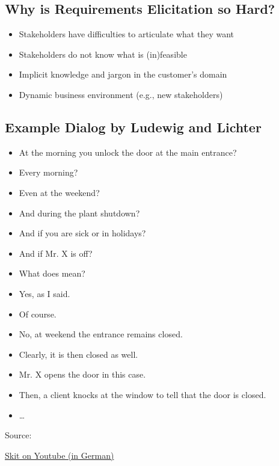 \subsection{Why is Requirements Elicitation so Hard?}
\begin{frame}{\insertsubsection}
	\begin{fancycolumns}[animation=none,widths={66}]
		\begin{example}{}
			\begin{itemize}
				\item Stakeholders have difficulties to articulate what they want
				\item Stakeholders do not know what is (in)feasible
				\item Implicit knowledge and jargon in the customer's domain
				\item Dynamic business environment (e.g., new stakeholders)
			\end{itemize}
		\end{example}
	\end{fancycolumns}
\end{frame}

\subsection{Example Dialog by Ludewig and Lichter}
\begin{frame}{\insertsubsection}
	\begin{fancycolumns}[animation=none]
		\begin{itemize}
			\item At the morning you unlock the door at the main entrance?
			\item Every morning?
			\item Even at the weekend?
			\item And during the plant shutdown?
			\item And if you are sick or in holidays?
			\item And if Mr. X is off?
			\item What does  mean?
		\end{itemize}
		\nextcolumn\vspace{5mm}
		\begin{itemize}
			\item Yes, as I said.
			\item Of course.
			\item No, at weekend the entrance remains closed.
			\item Clearly, it is then closed as well.
			\item Mr. X opens the door in this case.
			\item Then, a client knocks at the window to tell that the door is closed.
			\item \ldots
		\end{itemize}
	\end{fancycolumns}
	\vspace{5mm}
	
	Source: \ludewiglichter
	
	\href{https://youtu.be/NEUNEmJQGMw?t=1156}{Skit on Youtube (in German)}
\end{frame}

